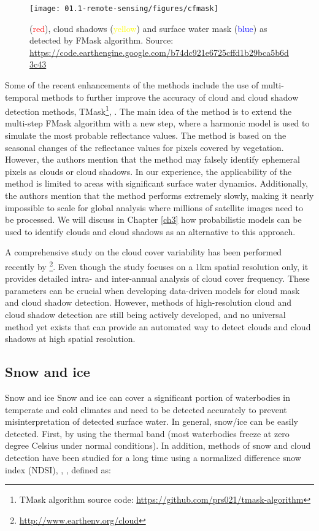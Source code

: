 \begin{figure}[H]
	\texttt{[image: 01.1-remote-sensing/figures/cfmask]}
	\caption{(\textcolor{red}{red}), cloud shadows (\textcolor{yellow}{yellow}) and surface water mask (\textcolor{blue}{blue}) as detected by FMask algorithm. Source: \url{https://code.earthengine.google.com/b74dc921e6725cffd1b29bca5b6d3c43}}
	\label{fig:cfmask}
\end{figure}

Some of the recent enhancements of the methods include the use of multi-temporal methods to further improve the accuracy of cloud and cloud shadow detection methods, TMask\footnote{TMask algorithm source code: \url{https://github.com/prs021/tmask-algorithm}}, \citet{zhu2014automated}. The main idea of the method is to extend the multi-step FMask algorithm with a new step, where a harmonic model is used to simulate the most probable reflectance values. The method is based on the seasonal changes of the reflectance values for pixels covered by vegetation. However, the authors mention that the method may falsely identify ephemeral pixels as clouds or cloud shadows. In our experience, the applicability of the method is limited to areas with significant surface water dynamics. Additionally, the authors mention that the method performs extremely slowly, making it nearly impossible to scale for global analysis where millions of satellite images need to be processed. We will discuss in Chapter \ref{ch3} how probabilistic models can be used to identify clouds and cloud shadows as an alternative to this approach. 

A comprehensive study on the cloud cover variability has been performed recently by \citet{wilson2016remotely}\footnote{\url{http://www.earthenv.org/cloud}}. Even though the study focuses on a 1km spatial resolution only, it provides detailed intra- and inter-annual analysis of cloud cover frequency. These parameters can be crucial when developing data-driven models for cloud mask and cloud shadow detection. However, methods of high-resolution cloud and cloud shadow detection are still being actively developed, and no universal method yet exists that can provide an automated way to detect clouds and cloud shadows at high spatial resolution. 

\subsection{Snow and ice}

Snow and ice Snow and ice can cover a significant portion of waterbodies in temperate and cold climates and need to be detected accurately to prevent misinterpretation of detected surface water. In general, snow/ice can be easily detected. First, by using the thermal band (most waterbodies freeze at zero degree Celsius under normal conditions). In addition, methods of snow and cloud detection have been studied for a long time using a normalized difference snow index (NDSI), \citet{valovcin1976snow}, \citet{hall1995development}, defined as:


